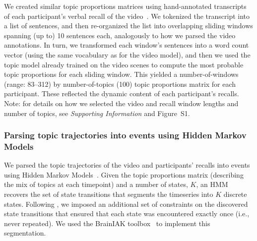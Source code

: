 \documentclass{article}
\newcommand{\topicopt}{S1}
\begin{document}
We created similar topic proportions matrices using hand-annotated transcripts of each participant's verbal recall of the video~\citep[annotated by][]{ChenEtal17}.  We tokenized the transcript into a list of sentences, and then re-organized the list into overlapping sliding windows spanning (up to) 10 sentences each, analogously to how we parsed the video annotations.  In turn, we transformed each window's sentences into a word count vector (using the same vocabulary as for the video model), and then we used the topic model already trained on the video scenes to compute the most probable topic proportions for each sliding window.  This yielded a number-of-windows (range: 83--312) by number-of-topics (100) topic proportions matrix for each participant.  These reflected the dynamic content of each participant's recalls.  Note: for details on how we selected the video and recall window lengths and number of topics, see \textit{Supporting Information} and Figure~\topicopt.


\subsubsection*{Parsing topic trajectories into events using Hidden Markov Models}
We parsed the topic trajectories of the video and participants' recalls into events using Hidden Markov Models~\citep[HMMs;][]{Rabi89}.  Given the topic proportions matrix (describing the mix of topics at each timepoint) and a number of states, $K$, an HMM recovers the set of state transitions that segments the timeseries into $K$ discrete states.  Following \cite{BaldEtal17}, we imposed an additional set of constraints on the discovered state transitions that ensured that each state was encountered exactly once (i.e., never repeated).  We used the BrainIAK toolbox~\citep{Brainiak} to implement this segmentation.
\end{document}
